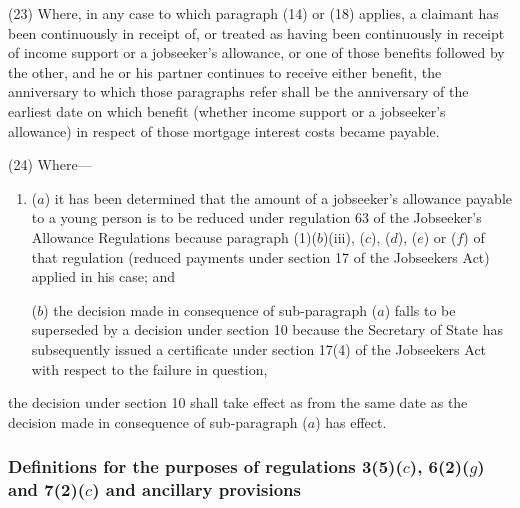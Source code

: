 \documentclass[12pt,a4paper]{article}
\begin{document}
(23) Where, in any case to which paragraph (14) or (18) applies, a claimant has been continuously in receipt of, or treated as having been continuously in receipt of income support or a jobseeker’s allowance, or one of those benefits followed by the other, and he or his partner continues to receive either benefit, the anniversary to which those paragraphs refer shall be the anniversary of the earliest date on which benefit (whether income support or a jobseeker’s allowance) in respect of those mortgage interest costs became payable.

(24) Where—
\begin{enumerate}\item[]
($a$) it has been determined that the amount of a jobseeker’s allowance payable to a young person is to be reduced under regulation 63 of the Jobseeker’s Allowance Regulations because paragraph (1)($b$)(iii), ($c$), ($d$), ($e$) or ($f$) of that regulation (reduced payments under section 17 of the Jobseekers Act) applied in his case; and

($b$) the decision made in consequence of sub-paragraph ($a$) falls to be superseded by a decision under section 10 because the Secretary of State has subsequently issued a certificate under section 17(4) of the Jobseekers Act with respect to the failure in question,
\end{enumerate}
the decision under section 10 shall take effect as from the same date as the decision made in consequence of sub-paragraph ($a$) has effect.


\subsubsection[7A. Definitions for the purposes of regulations 3(5)($c$), 6(2)($g$) and 7(2)($c$) and ancillary provisions]{Definitions for the purposes of regulations 3(5)($c$), 6(2)($g$) and 7(2)($c$) and ancillary provisions}
\end{document}
